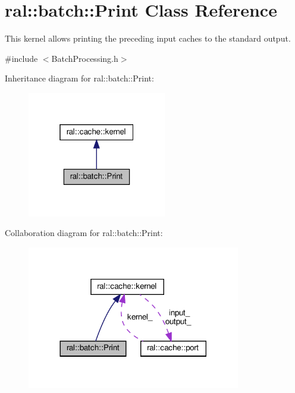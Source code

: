 \hypertarget{classral_1_1batch_1_1Print}{}\section{ral\+:\+:batch\+:\+:Print Class Reference}
\label{classral_1_1batch_1_1Print}


This kernel allows printing the preceding input caches to the standard output.  




{\ttfamily \#include $<$Batch\+Processing.\+h$>$}



Inheritance diagram for ral\+:\+:batch\+:\+:Print\+:\nopagebreak
\begin{figure}[H]
\begin{center}
\leavevmode
\includegraphics[width=172pt]{classral_1_1batch_1_1Print__inherit__graph}
\end{center}
\end{figure}


Collaboration diagram for ral\+:\+:batch\+:\+:Print\+:\nopagebreak
\begin{figure}[H]
\begin{center}
\leavevmode
\includegraphics[width=264pt]{classral_1_1batch_1_1Print__coll__graph}
\end{center}
\end{figure}
